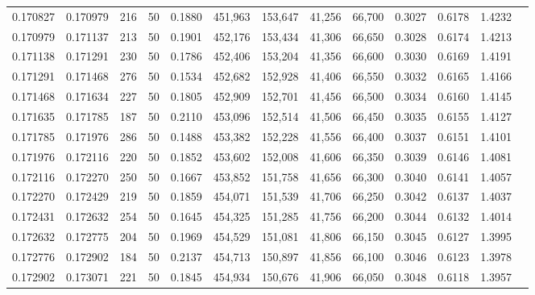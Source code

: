\begin{tabular}{rrrrrrrrrrrrr}
0.170827 & 0.170979 &   216 &  50 &                                     0.1880 & 451,963 & 153,647 &  41,256 &  66,700 & 0.3027 & 0.6178 & 1.4232 \\
0.170979 & 0.171137 &   213 &  50 &                                     0.1901 & 452,176 & 153,434 &  41,306 &  66,650 & 0.3028 & 0.6174 & 1.4213 \\
0.171138 & 0.171291 &   230 &  50 &                                     0.1786 & 452,406 & 153,204 &  41,356 &  66,600 & 0.3030 & 0.6169 & 1.4191 \\
0.171291 & 0.171468 &   276 &  50 &                                     0.1534 & 452,682 & 152,928 &  41,406 &  66,550 & 0.3032 & 0.6165 & 1.4166 \\
0.171468 & 0.171634 &   227 &  50 &                                     0.1805 & 452,909 & 152,701 &  41,456 &  66,500 & 0.3034 & 0.6160 & 1.4145 \\
0.171635 & 0.171785 &   187 &  50 &                                     0.2110 & 453,096 & 152,514 &  41,506 &  66,450 & 0.3035 & 0.6155 & 1.4127 \\
0.171785 & 0.171976 &   286 &  50 &                                     0.1488 & 453,382 & 152,228 &  41,556 &  66,400 & 0.3037 & 0.6151 & 1.4101 \\
0.171976 & 0.172116 &   220 &  50 &                                     0.1852 & 453,602 & 152,008 &  41,606 &  66,350 & 0.3039 & 0.6146 & 1.4081 \\
0.172116 & 0.172270 &   250 &  50 &                                     0.1667 & 453,852 & 151,758 &  41,656 &  66,300 & 0.3040 & 0.6141 & 1.4057 \\
0.172270 & 0.172429 &   219 &  50 &                                     0.1859 & 454,071 & 151,539 &  41,706 &  66,250 & 0.3042 & 0.6137 & 1.4037 \\
0.172431 & 0.172632 &   254 &  50 &                                     0.1645 & 454,325 & 151,285 &  41,756 &  66,200 & 0.3044 & 0.6132 & 1.4014 \\
0.172632 & 0.172775 &   204 &  50 &                                     0.1969 & 454,529 & 151,081 &  41,806 &  66,150 & 0.3045 & 0.6127 & 1.3995 \\
0.172776 & 0.172902 &   184 &  50 &                                     0.2137 & 454,713 & 150,897 &  41,856 &  66,100 & 0.3046 & 0.6123 & 1.3978 \\
0.172902 & 0.173071 &   221 &  50 &                                     0.1845 & 454,934 & 150,676 &  41,906 &  66,050 & 0.3048 & 0.6118 & 1.3957 \\

\end{tabular}
